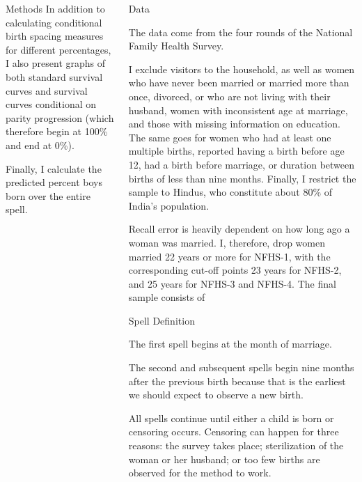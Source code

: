 \documentclass[final]{beamer}
\begin{document}
\begin{frame}{}
\begin{columns}[t]
\begin{column}{.3\linewidth}
\begin{block}{Methods}
In addition to calculating conditional birth spacing measures for different 
percentages, I also present graphs of both standard survival curves and
survival curves conditional on parity progression (which therefore
begin at 100\% and end at 0\%).

Finally, I calculate the predicted percent boys born over the entire spell.


\end{block}



\end{column}



\begin{column}{.3\linewidth}

\begin{block}{Data}

The data come from the four rounds of the National Family Health Survey.

I exclude visitors to the household, as well as
women who have never been married or married more than once, divorced, or who are 
not living with their husband,
women with inconsistent age at marriage,
and those with missing information on education.
The same goes for women who had at least one multiple births,
reported having a birth before age 12, had a birth before marriage, or
duration between births of less than nine months.
Finally, I restrict the sample to Hindus,
who constitute about 80\% of India's population.

Recall error is heavily dependent on how long ago a woman was married.
I, therefore, drop women married 22 years or more 
for NFHS-1, with the corresponding cut-off points 23 years for NFHS-2, 
and 25 years for NFHS-3 and NFHS-4.
The final sample consists of 


\end{block}

\begin{block}{Spell Definition}

The first spell begins at the month of marriage.

The second and subsequent spells begin nine months after the previous birth 
because that is the earliest we should expect to observe a new birth.

All spells continue until either a child is born or censoring occurs.
Censoring can happen for three reasons:
the survey takes place;
sterilization of the woman or her husband;
or too few births are observed for the method to work.


\end{block}
\end{column}
\end{columns}
\end{frame}
\end{document}
